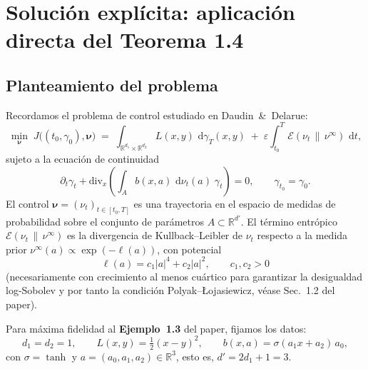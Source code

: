\documentclass[11pt, a4paper]{article}
\theoremstyle{definition}
\newcommand{\R}{\mathbb{R}}
\newcommand{\abs}[1]{\left|#1\right|}
\newcommand{\eps}{\varepsilon}
\newcommand{\dee}{\,\mathrm{d}}
\begin{document}
\section{Solución explícita: aplicación directa del Teorema 1.4}
\label{sec:explicita}

\subsection{Planteamiento del problema}
\label{ssec:planteamiento}

Recordamos el problema de control estudiado en Daudin~\&~Delarue:
\begin{equation}
  \min_{\boldsymbol{\nu}} \;
  J\bigl((t_0, \gamma_0), \boldsymbol{\nu}\bigr)
  \;=\;
  \int_{\R^{d_1} \times \R^{d_2}} L(x, y) \, \dee\gamma_T(x, y)
  \;+\;
  \eps \int_{t_0}^{T}
  \mathcal{E}(\nu_t \,\|\, \nu^{\infty}) \, \dee t,
  \label{eq:Jtotal}
\end{equation}
sujeto a la ecuación de continuidad
\begin{equation}
  \partial_t \gamma_t
  + \mathrm{div}_x \!\left(
    \int_A b(x, a) \, \dee\nu_t(a) \;\gamma_t
  \right) = 0,
  \qquad
  \gamma_{t_0} = \gamma_0.
  \label{eq:cont}
\end{equation}
El control $\boldsymbol{\nu} = (\nu_t)_{t \in [t_0, T]}$ es una trayectoria en
el espacio de medidas de probabilidad sobre el conjunto de parámetros
$A \subset \R^{d'}$. El término entrópico $\mathcal{E}(\nu_t \,\|\, \nu^{\infty})$
es la divergencia de Kullback--Leibler de $\nu_t$ respecto a la medida prior
$\nu^{\infty}(a) \propto \exp(-\ell(a))$, con potencial
\begin{equation}
  \ell(a) = c_1 \abs{a}^4 + c_2 \abs{a}^2,
  \qquad c_1, c_2 > 0
  \label{eq:ell}
\end{equation}
(necesariamente con crecimiento al menos cuártico para garantizar la
desigualdad log-Sobolev y por tanto la condición Polyak--{\L}ojasiewicz, véase
Sec.~1.2 del paper).

\medskip

Para máxima fidelidad al \textbf{Ejemplo~1.3} del paper, fijamos los datos:
\begin{equation}
  d_1 = d_2 = 1,
  \qquad
  L(x, y) = \tfrac{1}{2}(x - y)^2,
  \qquad
  b(x, a) = \sigma(a_1 x + a_2)\, a_0,
  \label{eq:setup}
\end{equation}
con $\sigma = \tanh$ y $a = (a_0, a_1, a_2) \in \R^3$, esto es, $d' = 2 d_1 + 1 = 3$.
\end{document}
